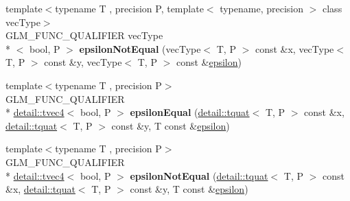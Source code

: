 \begin{DoxyCompactItemize}
\item 
\hypertarget{namespaceglm_a34387d61360bf88bcca96b797f53e49d}{{\footnotesize template$<$typename T , precision P, template$<$ typename, precision $>$ class vec\-Type$>$ }\\G\-L\-M\-\_\-\-F\-U\-N\-C\-\_\-\-Q\-U\-A\-L\-I\-F\-I\-E\-R vec\-Type\\*
$<$ bool, P $>$ {\bfseries epsilon\-Not\-Equal} (vec\-Type$<$ T, P $>$ const \&x, vec\-Type$<$ T, P $>$ const \&y, vec\-Type$<$ T, P $>$ const \&\hyperlink{group__gtc__constants_gacb41049b8d22c8aa90e362b96c524feb}{epsilon})}\label{namespaceglm_a34387d61360bf88bcca96b797f53e49d}

\item 
\hypertarget{namespaceglm_a4c75af68224e0fea510364c0ef246a46}{{\footnotesize template$<$typename T , precision P$>$ }\\G\-L\-M\-\_\-\-F\-U\-N\-C\-\_\-\-Q\-U\-A\-L\-I\-F\-I\-E\-R \\*
\hyperlink{structglm_1_1detail_1_1tvec4}{detail\-::tvec4}$<$ bool, P $>$ {\bfseries epsilon\-Equal} (\hyperlink{structglm_1_1detail_1_1tquat}{detail\-::tquat}$<$ T, P $>$ const \&x, \hyperlink{structglm_1_1detail_1_1tquat}{detail\-::tquat}$<$ T, P $>$ const \&y, T const \&\hyperlink{group__gtc__constants_gacb41049b8d22c8aa90e362b96c524feb}{epsilon})}\label{namespaceglm_a4c75af68224e0fea510364c0ef246a46}

\item 
\hypertarget{namespaceglm_a7f1b10921333eeda77cd5c1f4a4b2101}{{\footnotesize template$<$typename T , precision P$>$ }\\G\-L\-M\-\_\-\-F\-U\-N\-C\-\_\-\-Q\-U\-A\-L\-I\-F\-I\-E\-R \\*
\hyperlink{structglm_1_1detail_1_1tvec4}{detail\-::tvec4}$<$ bool, P $>$ {\bfseries epsilon\-Not\-Equal} (\hyperlink{structglm_1_1detail_1_1tquat}{detail\-::tquat}$<$ T, P $>$ const \&x, \hyperlink{structglm_1_1detail_1_1tquat}{detail\-::tquat}$<$ T, P $>$ const \&y, T const \&\hyperlink{group__gtc__constants_gacb41049b8d22c8aa90e362b96c524feb}{epsilon})}\label{namespaceglm_a7f1b10921333eeda77cd5c1f4a4b2101}


\end{DoxyCompactItemize}
